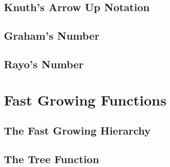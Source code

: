 
\subsection{Knuth's Arrow Up Notation}

\subsection{Graham's Number}


\subsection{Rayo's Number}





\section{Fast Growing Functions}




\subsection{The Fast Growing Hierarchy}



\subsection{The Tree Function}

